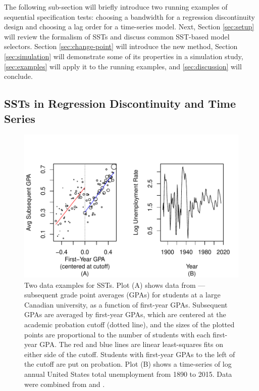 \documentclass[sts]{imsart}\usepackage[]{graphicx}\usepackage[]{color}
\makeatletter
\def\maxwidth{ %
  \ifdim\Gin@nat@width>\linewidth
    \linewidth
  \else
    \Gin@nat@width
  \fi
}
\makeatother
\begin{document}
The following sub-section will briefly introduce two running examples
of sequential specification tests: choosing a bandwidth for a
regression discontinuity design and choosing a lag order for a
time-series model.
Next, Section \ref{sec:setup} will review the formalism of SSTs and
discuss common SST-based model selectors.
Section \ref{sec:change-point} will introduce the new method, Section
\ref{sec:simulation} will demonstrate some of its properties in a
simulation study, \ref{sec:examples} will apply it to the running
examples, and \ref{sec:discussion} will conclude.

\subsection{SSTs in Regression Discontinuity and Time Series}\label{sec:exampleIntro}

\begin{figure}

\includegraphics[width=\maxwidth]{figure/examplePlots-1} 

\caption{Two data examples for SSTs. Plot (A) shows data from
  \citet{lso}---subsequent grade point averages (GPAs) for students
  at a large Canadian university, as a function of first-year
  GPAs. Subsequent GPAs are averaged by first-year GPAs, which are
  centered at the academic probation cutoff (dotted line), and the sizes
  of the plotted points are proportional to the number of students
  with each first-year GPA. The red and blue lines are linear least-squares
  fits on either side of the cutoff. Students with first-year GPAs
  to the left of  the cutoff are put on probation. Plot (B) shows a
  time-series of log annual United States total unemployment from 1890 to
  2015. Data were combined from \citet{urca} and \citet{cps}.}
\label{fig:example}
\end{figure}
\end{document}
